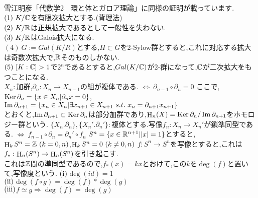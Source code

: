 \proof[Galois理論による証明のポイント]
\leavevmode\\
雪江明彦「代数学2　環と体とガロア理論」に同様の証明が載っています.\\
$(1)\ K/\C$を有限次拡大とする.(背理法)\\
$(2)\ K/\R$は正規拡大であるとして一般性を失わない.\\
$(3)\ K/\mathbb R$はGalois拡大になる.\\
$(4)\ G:=Gal(K/R)$とする,$H\subset G$を2-Sylow群とすると,これに対応する拡大は奇数次拡大で,$\mathbb R$そのものしかない.\\
$(5)\ [K:\C]>1$で$2^n$であるとすると,$Gal(K/\mathbb C)$が2-群になって,$\mathbb C$が二次拡大をもつことになる.\\
\proofx
{}
$X_n:$加群,$\partial_n:X_n\to X_{n-1}$の組が複体である.
$\iff\ \partial_{n-1} \circ \partial_{n} = 0$
{}
ここで,$\mathop{\mathrm{Ker}}\nolimits \partial_n =\{x\in X_n| \partial_n x = 0 \} $,\ $\Image \partial_{n+1} = \{ x_n \in X_n | \exists x_{n+1} \in X_{n+1} \ s.t. \ x_n = \partial_{n+1} x_{n+1}\}$\\
とおくと,$\mathop{\mathrm{Im}}\nolimits \partial_{n+1} \subset \mathop{\mathrm{Ker}}\nolimits \partial_{n}$は部分加群であり,$\mathop{\mathrm{H}}\nolimits_n(X) = \mathop{\mathrm{Ker}}\nolimits \partial_{n}/ \mathop{\mathrm{Im}}\nolimits \partial_{n+1} $をホモロジー群という.
{}
$\{X_n.\partial_n\},\{X_n'.\partial_n'\}:$複体とする.写像$f_n :X_n \to X_n'$が鎖準同型である.
$\iff\ f_{n-1}\circ\partial_n = \partial_n'\circ f_n$
\thm
$S^n=\{x\in\mathbb R^{n+1} | |x|=1\}$とすると,$\mathop{\mathrm{H}}\nolimits_k S^n = \mathbb Z\  (k=0,n)$,$\mathop{\mathrm{H}}\nolimits_k S^n = 0\  (k\neq 0,n)$
\thmx
\thm
$f:S^n \to S^n$を写像とすると,これは$f_*:\mathop{\mathrm{H}}\nolimits_n(S^n)\to \mathop{\mathrm{H}}\nolimits_n(S^n)$を引き起こす.\\
これは$\mathbb Z$間の準同型であるので,$f_*(x) = kx$とおけて,この$k$を$\deg(f)$と置いて,写像度という.
\thmx
\prop
$\rm (i)$$\deg(id)=1$\\
$\rm (ii)$$\deg(f\circ g) = \deg(f)*\deg(g)$\\
$\rm (iii)$$f \simeq g \Rightarrow \deg(f) = \deg(g)$\\
\propx


